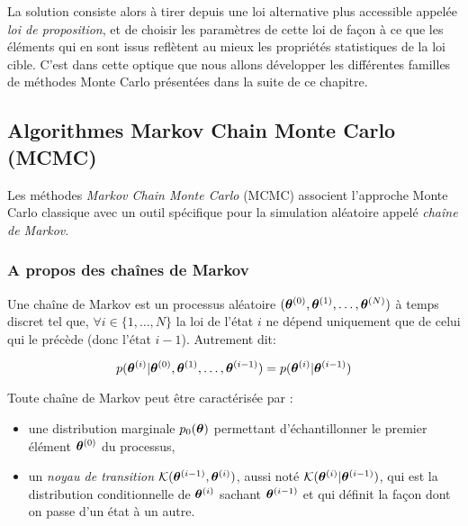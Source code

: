 La solution consiste alors à tirer depuis une loi alternative plus accessible appelée \textit{loi de proposition}, et de choisir les paramètres de cette loi de façon à ce que les éléments qui en sont issus reflètent au mieux les propriétés statistiques de la loi cible. C'est dans cette optique que nous allons développer les différentes familles de méthodes Monte Carlo présentées dans la suite de ce chapitre.\\


\subsection{Algorithmes Markov Chain Monte Carlo (MCMC)}

Les méthodes \textit{Markov Chain Monte Carlo} (MCMC) associent l'approche Monte Carlo classique avec un outil spécifique pour la simulation aléatoire appelé \textit{chaîne de Markov}.\\

\subsubsection{A propos des chaînes de Markov}

Une chaîne de Markov est un processus aléatoire  $({\bm{\theta}}^{(0)}, {\bm{\theta}}^{(1)}, \dots, {\bm{\theta}}^{(N)})$ à temps discret tel que, $\forall i \in \{1, \dots, N\}$ la loi de l'état $i$ ne dépend uniquement que de celui qui le précède (donc l'état $i-1$). Autrement dit:

\begin{equation}
	p({{\bm{\theta}}^{(i)}} | {\bm{\theta}}^{(0)}, {\bm{\theta}}^{(1)}, \dots, {{\bm{\theta}}^{(i-1)}}) = p({{\bm{\theta}}^{(i)}}|{{\bm{\theta}}^{(i-1)}})
	\label{eq_propriete_markov}
\end{equation}

Toute chaîne de Markov peut être caractérisée par :
\begin{itemize}
	\item une distribution marginale $p_0({\bm{\theta}})$ permettant d'échantillonner le premier élément ${\bm{\theta}}^{(0)}$ du processus,
	\item un \textit{noyau de transition} ${\mathcal{K}}({{\bm{\theta}}^{(i-1)}},{{\bm{\theta}}^{(i)}})$, aussi noté ${\mathcal{K}}({{\bm{\theta}}^{(i)}}|{{\bm{\theta}}^{(i-1)}})$, qui est la distribution conditionnelle de ${{\bm{\theta}}^{(i)}}$ sachant ${{\bm{\theta}}^{(i-1)}}$ et qui définit la façon dont on passe d'un état à un autre.\\
\end{itemize}

